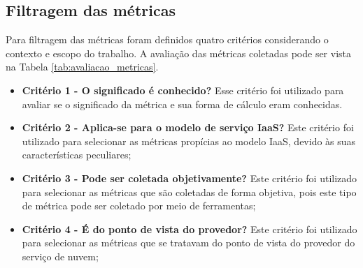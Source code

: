 \documentclass[conference]{IEEEtran}
\begin{document}
     
  \subsection{Filtragem das métricas}
  
      Para filtragem das métricas foram definidos quatro critérios considerando o contexto e escopo do trabalho. A avaliação das
      métricas coletadas pode ser vista na Tabela \ref{tab:avaliacao_metricas}.
   
	\begin{itemize}
	 \item \textbf{Critério 1 - O significado é conhecido?}
	    \subitem Esse critério foi utilizado para avaliar se o significado da métrica e sua forma de cálculo eram conhecidas.
	 \item \textbf{Critério 2 - Aplica-se para o modelo de serviço IaaS?}
	    \subitem Este critério foi utilizado para selecionar as métricas propícias ao modelo IaaS, 
	    devido às suas características peculiares;
	 \item \textbf{Critério 3 - Pode ser coletada objetivamente?}
	    \subitem Este critério foi utilizado para selecionar as métricas que são coletadas de forma objetiva, pois este tipo
	    de métrica pode ser coletado por meio de ferramentas;
	 \item \textbf{Critério 4 - É do ponto de vista do provedor?}
	    \subitem Este critério foi utilizado para selecionar as métricas que se tratavam do ponto de vista do provedor do serviço
	    de nuvem;
	\end{itemize}
	
\end{document}
